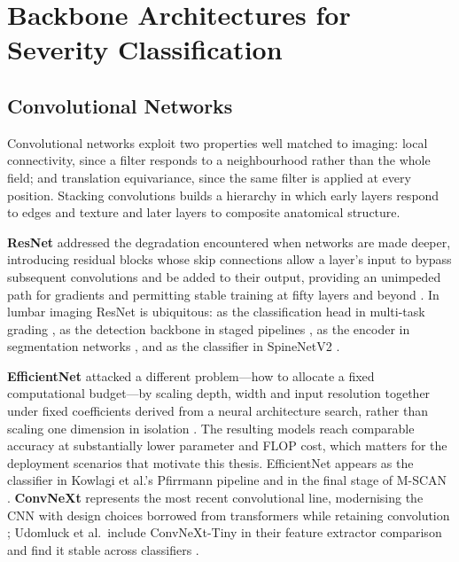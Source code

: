 \section{Backbone Architectures for Severity Classification}
\label{sec:lr-backbones}

\subsection{Convolutional Networks}
\label{sec:lr-cnns}

Convolutional networks exploit two properties well matched to imaging: local
connectivity, since a filter responds to a neighbourhood rather than the whole
field; and translation equivariance, since the same filter is applied at every
position. Stacking convolutions builds a hierarchy in which early layers respond
to edges and texture and later layers to composite anatomical structure.

\textbf{ResNet} addressed the degradation encountered when networks are made
deeper, introducing residual blocks whose skip connections allow a layer's input
to bypass subsequent convolutions and be added to their output, providing an
unimpeded path for gradients and permitting stable training at fifty layers and
beyond \cite{he2016deep}. In lumbar imaging ResNet is ubiquitous: as the
classification head in multi-task grading \cite{su2022automatic}, as the
detection backbone in staged pipelines \cite{zhang2023deep}, as the encoder in
segmentation networks \cite{batra2025mscan}, and as the classifier in
SpineNetV2 \cite{windsor2022spinenetv2}.

\textbf{EfficientNet} attacked a different problem---how to allocate a fixed
computational budget---by scaling depth, width and input resolution together
under fixed coefficients derived from a neural architecture search, rather than
scaling one dimension in isolation \cite{tan2019efficientnet}. The resulting
models reach comparable accuracy at substantially lower parameter and FLOP cost,
which matters for the deployment scenarios that motivate this thesis.
EfficientNet appears as the classifier in Kowlagi et al.'s Pfirrmann pipeline
\cite{kowlagi2022a} and in the final stage of M-SCAN \cite{batra2025mscan}.
\textbf{ConvNeXt} represents the most recent convolutional line, modernising the
CNN with design choices borrowed from transformers while retaining convolution
\cite{liu2022convnet}; Udomluck et al.\ include ConvNeXt-Tiny in their feature
extractor comparison and find it stable across classifiers
\cite{udomluck2026multitask}.

